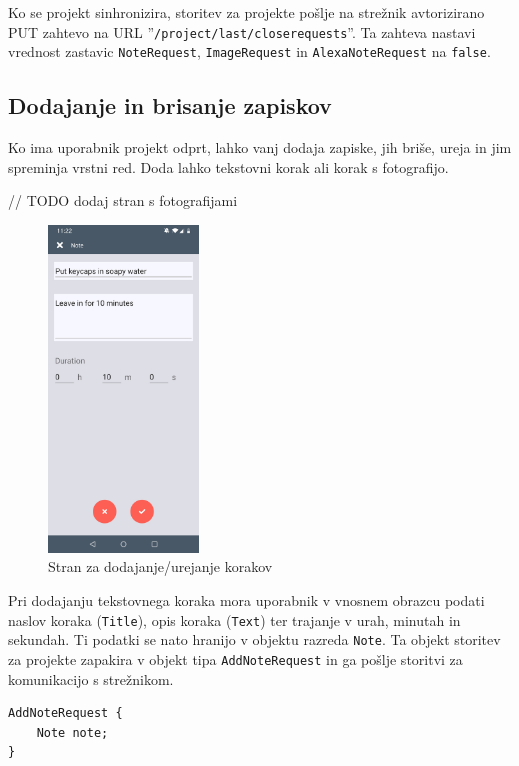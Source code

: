 \documentclass[a4paper, 12pt]{book}
\begin{document}
Ko se projekt sinhronizira, storitev za projekte pošlje na strežnik avtorizirano PUT zahtevo na URL ''\texttt{/project/last/closerequests}''.
Ta zahteva nastavi vrednost zastavic \texttt{NoteRequest}, \texttt{ImageRequest} in \texttt{AlexaNoteRequest} na \texttt{false}.


\subsection{Dodajanje in brisanje zapiskov}

Ko ima uporabnik projekt odprt, lahko vanj dodaja zapiske, jih briše, ureja in jim spreminja vrstni red.
Doda lahko tekstovni korak ali korak s fotografijo.

// TODO dodaj stran s fotografijami

\begin{figure}[H]
\begin{center}
	\includegraphics[width=4cm]{app_note}
\end{center}
	\caption{Stran za dodajanje/urejanje korakov}
\label{app_note}
\end{figure}

Pri dodajanju tekstovnega koraka mora uporabnik v vnosnem obrazcu podati naslov koraka (\texttt{Title}), opis koraka (\texttt{Text}) ter trajanje v urah, minutah in sekundah.
Ti podatki se nato hranijo v objektu razreda \texttt{Note}.
Ta objekt storitev za projekte zapakira v objekt tipa \texttt{AddNoteRequest} in ga pošlje storitvi za komunikacijo s strežnikom.

\begin{Verbatim}[commandchars=+\[\]]
AddNoteRequest { 
    Note note; 
}
\end{Verbatim}
\end{document}

